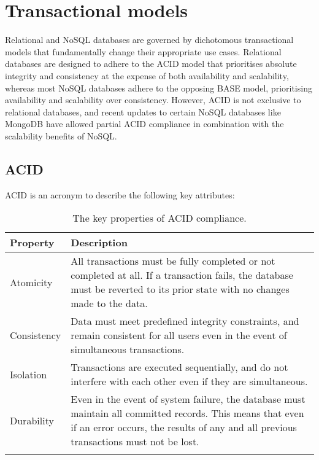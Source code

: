 \section{Transactional models}
Relational and NoSQL databases are governed by dichotomous transactional models that fundamentally change their appropriate use cases.
Relational databases are designed to adhere to the ACID model that prioritises absolute integrity and consistency at the expense of 
both availability and scalability, whereas most NoSQL databases adhere to the opposing BASE model, prioritising availability and scalability
over consistency. However, ACID is not exclusive to relational databases, and recent updates to certain NoSQL databases like MongoDB have 
allowed partial ACID compliance in combination with the scalability benefits of NoSQL.



\subsection{ACID}\label{subsec:ACID}
ACID is an acronym to describe the following key attributes:


\begin{longtable}{ | p{} | p{} | }
    \hline
    \cellcolor{blue!25}Property & \cellcolor{blue!25}Description\\
    \hline
    Atomicity & All transactions must be fully completed or not completed at all. If a transaction fails,
    the database must be reverted to its prior state with no changes made to the data.  \\
    \hline
    Consistency & Data must meet predefined integrity constraints, and remain consistent for all users even in the event 
    of simultaneous transactions.  \\
    \hline 
    Isolation & Transactions are executed sequentially, and do not interfere with each other even if they are simultaneous. \\
    \hline 
    Durability & Even in the event of system failure, the database must maintain all committed records. This means that 
    even if an error occurs, the results of any and all previous transactions must not be lost. \\
    \hline
    \caption{The key properties of ACID compliance. \autocite{awsACIDVsBASE,neo4jDataConsistencyModels2023}}\label{tab:ACID}
\end{longtable}

